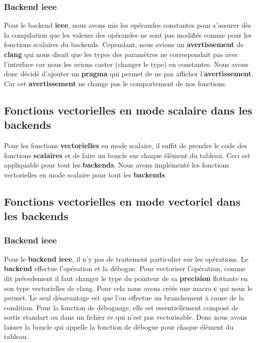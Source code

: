 \documentclass[11pt]{article}
\begin{document}
\subsubsection{Backend ieee}
\label{sec:org7f43e86}

Pour le backend \textbf{ieee}, nous avons mis les opérandes constantes pour
s'assurer dès la compilation que les valeurs des opérandes ne sont pas
modifiés comme pour les fonctions scalaires du backends. Cependant, nous
avions un \textbf{avertissement} de \textbf{clang} qui nous disait que les types des paramètres
ne correspondait pas avec l'interface car nous les avions caster (changer le
type) en constantes. Nous avons donc décidé d'ajouter un \textbf{pragma} qui permet
de ne pas afficher l'\textbf{avertissement}. Car cet \textbf{avertissement} ne change pas
le comportement de nos fonctions.

\subsection{Fonctions vectorielles en mode scalaire dans les backends}
\label{sec:org97d2039}

Pour les fonctions \textbf{vectorielles} en mode scalaire, il suffit de
prendre le code des fonctions \textbf{scalaires} et de faire un boucle sur
chaque élément du tableau. Ceci est appliquable pour tout les
\textbf{backends}.
\vspace{5mm}
Nous avons implémenté les fonctions vectorielles en mode scalaire pour tout
les \textbf{backends}.

\subsection{Fonctions vectorielles en mode vectoriel dans les backends}
\label{sec:orge8c5987}
\subsubsection{Backend ieee}
\label{sec:orgdcba833}

Pour le \textbf{backend ieee}, il n'y pas de traitement particulier sur
les opérations. Le \textbf{backend} effectue l'opération et la débogue.
\vspace{5mm}
Pour vectoriser l'opération, comme dit précedement il faut changer le type
du pointeur de sa \textbf{precision} flottante en son type vectorielles de
clang. Pour cela nous avons créés une macro \textbf{c} qui nous le
permet. Le seul désavantage est que l'on effectue un branchement à
cause de la condition.
\vspace{5mm}
Pour la fonction de déboguage, elle est essentiellement composé de
sortie standart ou dans un fichier ce qui n'est pas
vectorisable. Donc nous avons laisser la boucle qui appelle la
fonction de débogue pour chaque élément du tableau.
\end{document}
